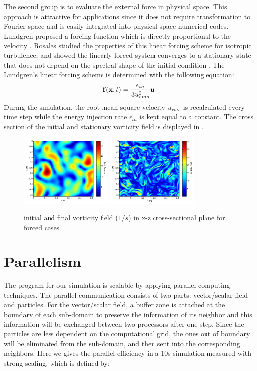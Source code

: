 The second group is to evaluate the external force in physical space. This approach is attractive for applications since it does not require transformation to Fourier space and is easily integrated into physical-space numerical codes. Lundgren proposed a forcing function which is directly proportional to the velocity \cite{Lundgren2003Linearly}. Rosales studied the properties of this linear forcing scheme for isotropic turbulence, and showed the linearly forced system converges to a stationary state that does not depend on the spectral shape of the initial condition \cite{Rosales2005Linear}. The Lundgren's linear forcing scheme is determined with the following equation:
\begin{equation}
\mathbf{f}(\mathbf{x}, t) = \frac{\epsilon_{in}}{3u_{rms}^2}\mathbf{u}
\end{equation}
During the simulation, the root-mean-square velocity $u_{rms}$ is recalculated every time step while the energy injection rate $\epsilon_{in}$ is kept equal to a constant.
The cross section of the initial and stationary vorticity field is displayed in .

\begin{figure}[h]\centering
\includegraphics[width=0.4\textwidth]{Figures/vortex-0}
\includegraphics[width=0.4\textwidth]{Figures/vortex-1}

\caption{initial and final vorticity field ($1/s$) in x-z cross-sectional
plane for forced cases\label{fig:vort}}
\end{figure}

\section{Parallelism}
The program for our simulation is scalable by applying parallel computing
techniques. The parallel communication consists of two parts: vector/scalar
field and particles. For the vector/scalar field, a buffer zone is
attached at the boundary of each sub-domain to preserve the information
of its neighbor and this information will be exchanged between two
processors after one step. Since the particles are less
dependent on the computational grid, the ones out of boundary will be
eliminated from the sub-domain, and then sent into the corresponding
neighbors. Here we gives the parallel efficiency in a 10s simulation
measured with strong scaling, which is defined by:

